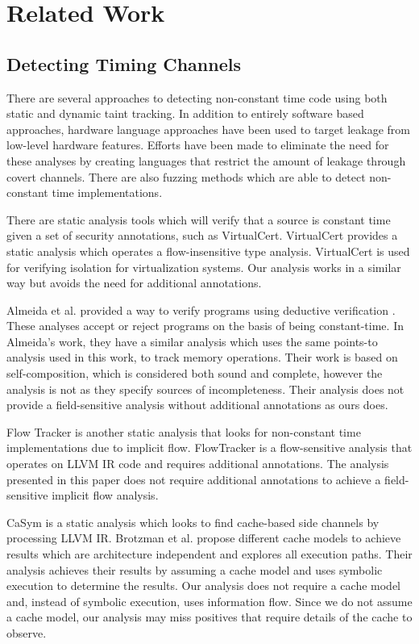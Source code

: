 \section{Related Work}
\subsection{Detecting Timing Channels}
   There are several approaches to detecting non-constant time code using both
   static and dynamic taint tracking. In addition to entirely software based
   approaches, hardware language approaches have been used to target leakage from
   low-level hardware features. Efforts have been made to eliminate the
   need for these analyses by creating languages that restrict the amount of
   leakage through covert channels. There are also fuzzing methods which are
   able to detect non-constant time implementations\cite{Somorovsky}.

   There are static analysis tools which will verify that a source is constant
   time given a set of security annotations, such as
   VirtualCert\cite{VirtualCert}. VirtualCert provides a static analysis which
   operates a flow-insensitive type analysis. VirtualCert is used for verifying
   isolation for virtualization systems. Our analysis works in a similar way but
   avoids the need for additional annotations.

   Almeida et al. provided a way to verify programs using deductive verification
   \cite{almeida2016verifying}. These analyses accept or reject programs on the
   basis of being constant-time. In Almeida's work, they have a similar analysis
   which uses the same points-to analysis used in this work, to track memory
   operations. Their work is based on self-composition, which is considered both
   sound and complete, however the analysis is not as they specify sources
   of incompleteness. Their analysis does not provide a field-sensitive
   analysis without additional annotations as ours does.

   Flow Tracker is another static analysis that looks for non-constant time
   implementations due to implicit flow\cite{FlowTracker}. FlowTracker is a
   flow-sensitive analysis that operates on LLVM IR code and requires additional
   annotations. The analysis presented in this paper does not require
   additional annotations to achieve a field-sensitive implicit flow analysis.

   CaSym is a static analysis which looks to find cache-based side channels by
   processing LLVM IR\cite{brotzmancasym}. Brotzman et al. propose different
   cache models to achieve results which are architecture independent and
   explores all execution paths. Their analysis achieves their results by
   assuming a cache model and uses symbolic execution to determine the results.
   Our analysis does not require a cache model and, instead of symbolic
   execution, uses information flow. Since we do not assume a cache model, our
   analysis may miss positives that require details of the cache to
   observe.

